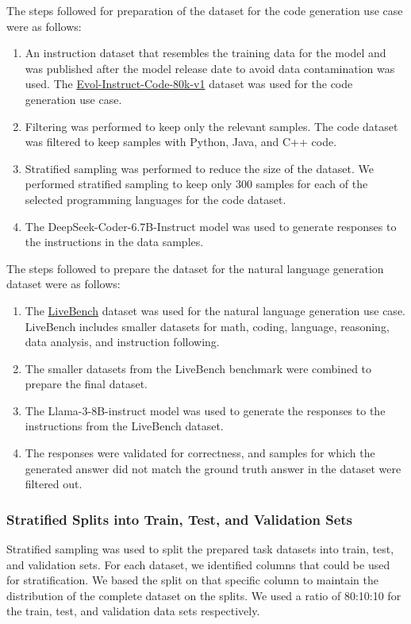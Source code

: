 The steps followed for preparation of the dataset for the code generation use case were as follows:
\begin{enumerate}
\item An instruction dataset that resembles the training data for the model and was published after the model release date to avoid data contamination was used. The \href{https://huggingface.co/datasets/nickrosh/Evol-Instruct-Code-80k-v1}{Evol-Instruct-Code-80k-v1} dataset was used for the code generation use case.
\item Filtering was performed to keep only the relevant samples. The code dataset was filtered to keep samples with Python, Java, and C++ code.
\item Stratified sampling was performed to reduce the size of the dataset. 
We performed stratified sampling to keep only 300 samples for each of the selected programming languages for the code dataset.
\item The DeepSeek-Coder-6.7B-Instruct model was used to generate responses to the instructions in the data samples. 
\end{enumerate}

The steps followed to prepare the dataset for the natural language generation dataset were as follows:
\begin{enumerate}
\item The \href{https://huggingface.co/livebench}{LiveBench} dataset was used for the natural language generation use case. LiveBench includes smaller datasets for math, coding, language, reasoning, data analysis, and instruction following.
\item The smaller datasets from the LiveBench benchmark were combined to prepare the final dataset.
\item The Llama-3-8B-instruct model was used to generate the responses to the instructions from the LiveBench dataset.
\item The responses were validated for correctness, and samples for which the generated answer did not match the ground truth answer in the dataset were filtered out.
\end{enumerate}

\subsubsection{Stratified Splits into Train, Test, and Validation Sets} \label{traintestsplit}
Stratified sampling was used to split the prepared task datasets into train, test, and validation sets. For each dataset, we identified columns that could be used for stratification. We based the split on that specific column to maintain the distribution of the complete dataset on the splits. We used a ratio of 80:10:10 for the train, test, and validation data sets respectively.


